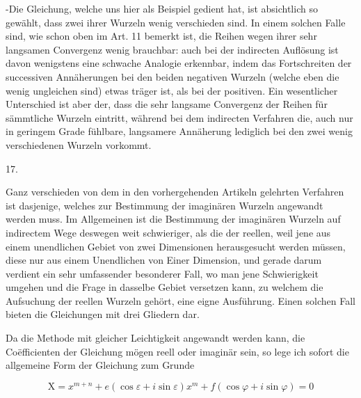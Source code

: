 \documentclass[twoside,12pt, showframe]{memoir}
\begin{document}
-Die Gleichung, welche uns hier als Beispiel gedient hat, ist absichtlich so gewählt, dass zwei ihrer Wurzeln wenig verschieden sind. In einem solchen Falle sind, wie schon oben im Art. 11 bemerkt ist, die Reihen wegen ihrer sehr langsamen Convergenz wenig brauchbar: auch bei der indirecten Auflösung ist davon wenigstens eine schwache Analogie erkennbar, indem das Fortschreiten der successiven Annäherungen bei den beiden negativen Wurzeln (welche eben die wenig ungleichen sind) etwas träger ist, als bei der positiven. Ein wesentlicher Unterschied ist aber der, dass die sehr langsame Convergenz der Reihen für sämmtliche Wurzeln eintritt, während bei dem indirecten Verfahren die, auch nur in geringem Grade fühlbare, langsamere Annäherung lediglich bei den zwei wenig verschiedenen Wurzeln vorkommt.

17.

Ganz verschieden von dem in den vorhergehenden Artikeln gelehrten Verfahren ist dasjenige, welches zur Bestimmung der imaginären Wurzeln angewandt werden muss. Im Allgemeinen ist die Bestimmung der imaginären Wurzeln auf indirectem Wege deswegen weit schwieriger, als die der reellen, weil jene aus einem unendlichen Gebiet von zwei Dimensionen herausgesucht werden müssen, diese nur aus einem Unendlichen von Einer Dimension, und gerade darum verdient ein sehr umfassender besonderer Fall, wo man jene Schwierigkeit umgehen und die Frage in dasselbe Gebiet versetzen kann, zu welchem die Aufsuchung der reellen Wurzeln gehört, eine eigne Ausführung. Einen solchen Fall bieten die Gleichungen mit drei Gliedern dar.

Da die Methode mit gleicher Leichtigkeit angewandt werden kann, die Coëfficienten der Gleichung mögen reell oder imaginär sein, so lege ich sofort die allgemeine Form der Gleichung zum Grunde

\[
\mathrm{X}=x^{m+n}+e(\cos \varepsilon+i \sin \varepsilon) x^{m}+f(\cos \varphi+i \sin \varphi)=0
\]
\end{document}
